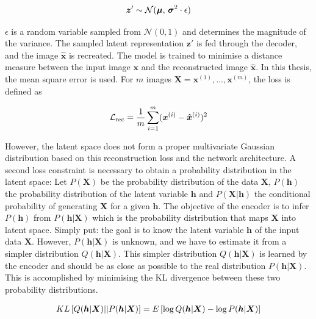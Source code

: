 \begin{align}\eqlbl{hso_1}
	\boldsymbol{z}' \sim \mathcal{N}(\boldsymbol{\mu},\,\boldsymbol{\sigma}^{2} \cdot \epsilon)
\end{align}

$\epsilon$ is a random variable sampled from  $\mathcal{N}(0, 1)$ and determines the magnitude of the variance. The sampled latent representation $\boldsymbol{z}'$ is fed through the decoder, and the image $\hat{\boldsymbol{x}}$ is recreated. The model is trained to minimise a distance measure between the input image $\boldsymbol{x}$ and the reconstructed image $\hat{\boldsymbol{x}}$. In this thesis, the mean square error is used. For $m$ images $\boldsymbol{X} = \boldsymbol{x}^{(1)}, ..., \boldsymbol{x}^{(m)}$, the loss is defined as

\begin{align}\eqlbl{hso_2}
	\mathcal{L}_{\text{rec}} = \frac{1}{m} \sum_{i=1}^{m} (\boldsymbol{x}^{(i)} - \boldsymbol{\hat{x}}^{(i)})^2
\end{align}

However, the latent space does not form a proper multivariate Gaussian distribution based on this reconstruction loss and the network architecture. A second loss constraint is necessary to obtain a probability distribution in the latent space: Let $P(\boldsymbol{X})$ be the probability distribution of the data $\boldsymbol{X}$, $P(\boldsymbol{h})$ the probability distribution of the latent variable $\boldsymbol{h}$ and $P(\boldsymbol{X}|\boldsymbol{h})$ the conditional probability of generating $\boldsymbol{X}$ for a given $\boldsymbol{h}$. The objective of the encoder is to infer $P(\boldsymbol{h})$ from $P(\boldsymbol{h}|\boldsymbol{X})$ which is the probability distribution that maps $\boldsymbol{X}$ into latent space. Simply put: the goal is to know the latent variable $\boldsymbol{h}$ of the input data $\boldsymbol{X}$.
However, $P(\boldsymbol{h}|\boldsymbol{X})$ is unknown, and we have to estimate it from a simpler distribution $Q(\boldsymbol{h}|\boldsymbol{X})$. This simpler distribution $Q(\boldsymbol{h}|\boldsymbol{X})$ is learned by the encoder and should be as close as possible to the real distribution $P(\boldsymbol{h}|\boldsymbol{X})$. This is accomplished by minimising the KL divergence between these two probability distributions.

\begin{align}\eqlbl{hso_3}
	KL \left[ Q(\boldsymbol{h}|\boldsymbol{X}) || P(\boldsymbol{h}|\boldsymbol{X}) \right] = E \left[ \log Q(\boldsymbol{h}|\boldsymbol{X}) - \log P(\boldsymbol{h}|\boldsymbol{X}) \right]
\end{align}

